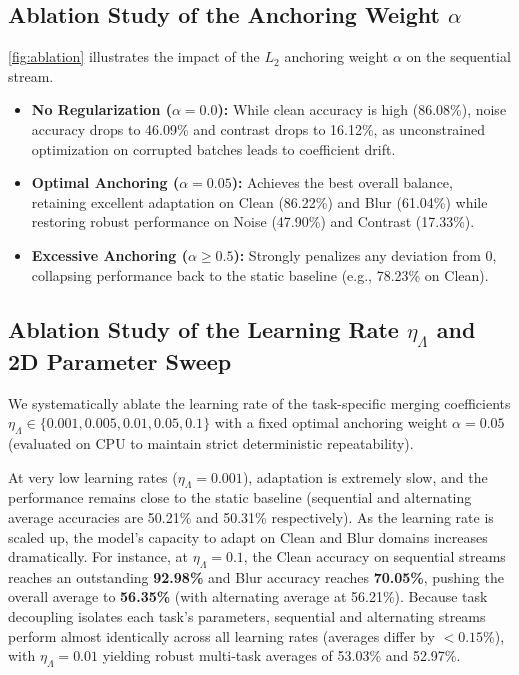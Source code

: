 \documentclass{article}
\theoremstyle{plain}
\theoremstyle{definition}
\theoremstyle{remark}
\begin{document}
\subsection{Ablation Study of the Anchoring Weight $\alpha$}
\cref{fig:ablation} illustrates the impact of the $L_2$ anchoring weight $\alpha$ on the sequential stream.
\begin{itemize}
    \item \textbf{No Regularization ($\alpha = 0.0$):} While clean accuracy is high (86.08\%), noise accuracy drops to 46.09\% and contrast drops to 16.12\%, as unconstrained optimization on corrupted batches leads to coefficient drift.
    \item \textbf{Optimal Anchoring ($\alpha = 0.05$):} Achieves the best overall balance, retaining excellent adaptation on Clean (86.22\%) and Blur (61.04\%) while restoring robust performance on Noise (47.90\%) and Contrast (17.33\%).
    \item \textbf{Excessive Anchoring ($\alpha \ge 0.5$):} Strongly penalizes any deviation from 0, collapsing performance back to the static baseline (e.g., 78.23\% on Clean).
\end{itemize}

\subsection{Ablation Study of the Learning Rate $\eta_{\Lambda}$ and 2D Parameter Sweep}
We systematically ablate the learning rate of the task-specific merging coefficients $\eta_{\Lambda} \in \{0.001, 0.005, 0.01, 0.05, 0.1\}$ with a fixed optimal anchoring weight $\alpha = 0.05$ (evaluated on CPU to maintain strict deterministic repeatability).

At very low learning rates ($\eta_{\Lambda} = 0.001$), adaptation is extremely slow, and the performance remains close to the static baseline (sequential and alternating average accuracies are 50.21\% and 50.31\% respectively). As the learning rate is scaled up, the model's capacity to adapt on Clean and Blur domains increases dramatically. For instance, at $\eta_{\Lambda} = 0.1$, the Clean accuracy on sequential streams reaches an outstanding \textbf{92.98\%} and Blur accuracy reaches \textbf{70.05\%}, pushing the overall average to \textbf{56.35\%} (with alternating average at 56.21\%). Because task decoupling isolates each task's parameters, sequential and alternating streams perform almost identically across all learning rates (averages differ by $<0.15\%$), with $\eta_{\Lambda}=0.01$ yielding robust multi-task averages of 53.03\% and 52.97\%.
\end{document}
